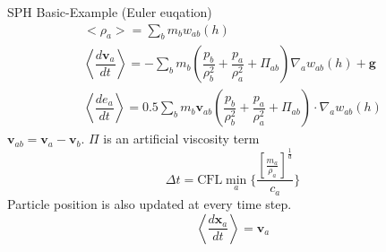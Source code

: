 \documentclass{beamer}
\begin{document}
\begin{frame}{SPH Basic-Example (Euler euqation) }
\begin{align}
<\rho_a> = \sum_b m_b w_{ab} \left(h\right) \label{eq:ns-sph-d} \\
\left\langle\dfrac{d \textbf{v}_a}{d t}\right\rangle = -\sum_b m_b \left(\dfrac{p_b}{\rho_b^2} + \dfrac{p_a}{\rho_a^2} + \Pi_{ab}\right) \nabla_a w_{a b}\left(h\right) +\textbf{g} \label{eq:ns-sph-v} \\
\left\langle\dfrac{d e_a}{d t}\right\rangle=
 0.5\sum_b m_b \textbf{v}_{a b}\left(\dfrac{p_b}{\rho_b^2} + \dfrac{p_a}{\rho_a^2} + \Pi_{ab}\right) \cdot \nabla_a w_{a b}\left(h\right) \label{eq:ns-sph-e}
\end{align}
$\textbf{v}_{a b} = \textbf{v}_a - \textbf{v}_b$. $\Pi$ is an artificial viscosity term
\begin{equation}
\Delta t = \textrm{CFL} \min_a \bigg \lbrace \dfrac{\left[\frac{m_a}{\rho_a}\right]^{\frac{1}{d}}}{c_a} \bigg \rbrace
\end{equation}
Particle position is also updated at every time step.
\begin{equation}
\left\langle\dfrac{d \textbf{x}_a}{dt}\right\rangle = \textbf{v}_a \label{eq:SPH-update-pos}
\end{equation}
\end{frame}
\end{document}
